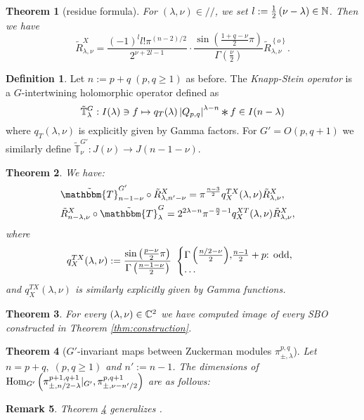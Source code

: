 \documentclass[12pt]{article} %
\newcommand{\Conv}{\mathop{\scalebox{1.5}{\raisebox{-0.2ex}{$\ast$}}}}
\newcommand{\assign}{:=}
\newtheorem{theorem}{Theorem}
\newcommand{\Hom}{\mbox{\normalfont Hom}}
\newtheorem{remark}[theorem]{Remark}
\theoremstyle{definition}
\newtheorem{definition}{Definition}
\theoremstyle{exampstyle} \newtheorem{examp}[theorem]{Theorem}
\renewcommand{\Q}{Q_{p,q}}
\newcommand{\todd}{\mbox{\textrm{: odd}}}
\begin{document}
\begin{theorem}[residue formula]
	For $(\lambda,\nu)\in//$, we set $l:=\frac{1}{2}\left( \nu-\lambda \right)\in\mathbb{N}$. Then we have
  \[\tilde{R}_{\lambda,\nu}^X  = \frac{ (- 1)^l l!\pi^{(n - 2) / 2} 
		}{2^{ \nu + 2 l-1}}\cdot  \frac{\sin\left( \frac{1+q-\nu}{2}\pi \right)}{\Gamma\left( \frac{\nu}{2} \right)}
	\tilde{R}_{\lambda,\nu}^{ \left\{ o \right\} }.\]
	\end{theorem}
	\begin{definition}
		Let $n:=p+q\;(p,q\ge1)$ as before.
		The {\it Knapp-Stein operator} is a $G$-intertwining holomorphic operator defined as
		\begin{equation*}
		\tilde{\mathbb{T}}_{\lambda}^G:I(\lambda)\ni f\mapsto q_T(\lambda)\myabs{\Q}^{\lambda-n}\Conv f\in I(n-\lambda)
		\end{equation*}
		where $q_T(\lambda,\nu)$ is explicitly given by Gamma factors.
		For $G'=O(p,q+1)$ we similarly define $\tilde{\mathbb{T}}^{G'}_\nu:J(\nu)\to J(n-1-\nu)$.
	\end{definition}
	\begin{theorem}
		
		We have:
\begin{eqnarray}
    & \tilde{\mathbbm{T}}^{G'}_{n-1 - \nu} \circ \tilde{R}^X_{\lambda, n' - \nu} =\pi^{\frac{n - 3}{2}} q^{T X}_X
  (\lambda, \nu) \tilde{R}^X_{\lambda, \nu}, &  \nonumber\\
  & \tilde{R}_{n - \lambda, \nu}^X \circ \tilde{\mathbbm{T}}^G_{\lambda} =2^{2\lambda-n}\pi^{-\frac{n}{2}-1} q^{X T}_X
  (\lambda, \nu) \tilde{R}_{\lambda, \nu}^X, &  \nonumber
  \end{eqnarray}
  where
  \begin{gather*}
  q^{T X}_X (\lambda, \nu) \assign\frac{\sin\left( \frac{p-\nu}{2} \pi\right)}{\Gamma\left( \frac{n-1-\nu}{2} \right)} \ \left\{
	  \begin{array}{@{}l@{}l}
    {\Gamma\left( \frac{n / 2 - \nu}{2} \right)}, & \frac{n - 1}{2}+p\todd,\\
    \dots&
  \end{array} \right.
\end{gather*}
and $q_X^{TX}(\lambda,\nu)$ is similarly explicitly given by Gamma functions.
	\end{theorem}
	\begin{theorem}
		For every $(\lambda,\nu)\in\mathbb{C}^2$ we have computed image of every SBO constructed in Theorem \ref{thm:construction}.
	\end{theorem}
\begin{theorem}[$G'$-invariant maps between Zuckerman modules $\pi_{\pm,\lambda}^{p,q}$]\label{thm:Aq}
	Let $n=p+q,\;(p,q\ge1)$ and $n':=n-1$.
	The dimensions of $\Hom_{G'}\left(\pi_{\pm,{n}/{2}-\lambda}^{p+1,q+1}\kern-0.3em\mid_{G'} ,\pi_{\pm,\nu-{n'}/{2}}^{p,q+1} \right)$
	are as follows:\newline
{}\\\vspace{\baselineskip}
\end{theorem}
\begin{remark}
Theorem \ref{thm:Aq} generalizes \cite[Thms. 12.1 and 1.3]{kobayashi2015symmetry}.
\end{remark}
\nocite{kobayashi2015program}
\small


\end{document}
